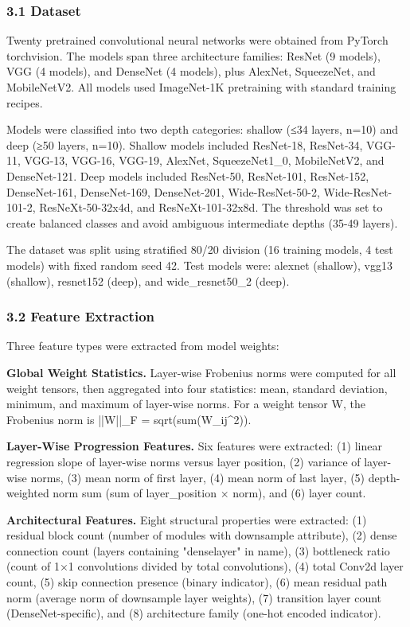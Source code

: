 
\subsubsection{3.1 Dataset}

Twenty pretrained convolutional neural networks were obtained from PyTorch torchvision. The models span three architecture families: ResNet (9 models), VGG (4 models), and DenseNet (4 models), plus AlexNet, SqueezeNet, and MobileNetV2. All models used ImageNet-1K pretraining with standard training recipes.

Models were classified into two depth categories: shallow (≤34 layers, n=10) and deep (≥50 layers, n=10). Shallow models included ResNet-18, ResNet-34, VGG-11, VGG-13, VGG-16, VGG-19, AlexNet, SqueezeNet1_0, MobileNetV2, and DenseNet-121. Deep models included ResNet-50, ResNet-101, ResNet-152, DenseNet-161, DenseNet-169, DenseNet-201, Wide-ResNet-50-2, Wide-ResNet-101-2, ResNeXt-50-32x4d, and ResNeXt-101-32x8d. The threshold was set to create balanced classes and avoid ambiguous intermediate depths (35-49 layers).

The dataset was split using stratified 80/20 division (16 training models, 4 test models) with fixed random seed 42. Test models were: alexnet (shallow), vgg13 (shallow), resnet152 (deep), and wide_resnet50_2 (deep).

\subsubsection{3.2 Feature Extraction}

Three feature types were extracted from model weights:

\textbf{Global Weight Statistics.} Layer-wise Frobenius norms were computed for all weight tensors, then aggregated into four statistics: mean, standard deviation, minimum, and maximum of layer-wise norms. For a weight tensor W, the Frobenius norm is ||W||_F = sqrt(sum(W_{ij}^2)).

\textbf{Layer-Wise Progression Features.} Six features were extracted: (1) linear regression slope of layer-wise norms versus layer position, (2) variance of layer-wise norms, (3) mean norm of first layer, (4) mean norm of last layer, (5) depth-weighted norm sum (sum of layer_position × norm), and (6) layer count.

\textbf{Architectural Features.} Eight structural properties were extracted: (1) residual block count (number of modules with downsample attribute), (2) dense connection count (layers containing "denselayer" in name), (3) bottleneck ratio (count of 1×1 convolutions divided by total convolutions), (4) total Conv2d layer count, (5) skip connection presence (binary indicator), (6) mean residual path norm (average norm of downsample layer weights), (7) transition layer count (DenseNet-specific), and (8) architecture family (one-hot encoded indicator).

